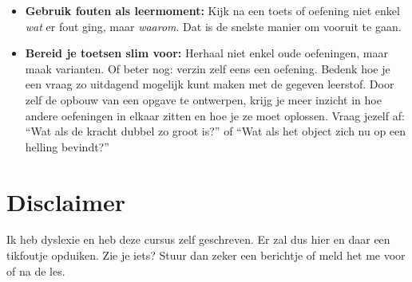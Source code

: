 \documentclass{ximera}
\begin{document}
\begin{itemize}
  Heb je moeite met de wiskundige technieken? Oefen ze dan extra in.
  De beste manier om ze onder de knie te krijgen, is door regelmatig korte oefensessies te houden.
  Plan bijvoorbeeld drie vaste momenten per dag in waarop je telkens vijf minuten met pen en papier wiskundige technieken oefent.
  Tijdens deze oefenmomenten mag je niet naar de oplossingen of hulpmiddelen kijken tot de sessie voorbij is.
  \newline
  Deze sessies zijn een aanvulling op je gewone studiemomenten, geen vervanging ervan.
  Als je dit een tijd volhoudt, zal je merken dat je de technieken beter beheerst en sneller toepast.
  \begin{remark}[foldable=true,title={Spaced-repetitionmethode}]\nl
  Deze methode is gebaseerd op \textit{"spaced repetition"}, waarbij je de leerstof herhaalt vlak na het leren, vervolgens één dag later, één week later en één maand later.
  Op die manier bereik je met minder totale studietijd een groter en langduriger leerresultaat.
  Het nadeel is wel dat deze aanpak wat planning en discipline vraagt.
  \end{remark}

  \item \textbf{Gebruik fouten als leermoment:}  
  Kijk na een toets of oefening niet enkel \textit{wat} er fout ging, maar \textit{waarom}.  
  Dat is de snelste manier om vooruit te gaan.

  \item \textbf{Bereid je toetsen slim voor:}  
  Herhaal niet enkel oude oefeningen, maar maak varianten. Of beter nog: verzin zelf eens een oefening. Bedenk hoe je een vraag zo uitdagend mogelijk kunt maken met de gegeven leerstof. Door zelf de opbouw van een opgave te ontwerpen, krijg je meer inzicht in hoe andere oefeningen in elkaar zitten en hoe je ze moet oplossen.
  Vraag jezelf af: “Wat als de kracht dubbel zo groot is?” of “Wat als het object zich nu op een helling bevindt?”
\end{itemize}

\section*{Disclaimer}
Ik heb dyslexie en heb deze cursus zelf geschreven. Er zal dus hier en daar een tikfoutje opduiken. Zie je iets? Stuur dan zeker een berichtje of meld het me voor of na de les.
\end{document}
